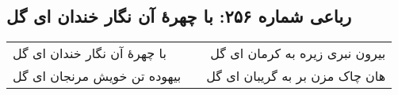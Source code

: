 \begin{center}
\section*{رباعی شماره ۲۵۶: با چهرهٔ آن نگار خندان ای گل}
\label{sec:sh256}
\begin{longtable}{l p{0.5cm} r}
با چهرهٔ آن نگار خندان ای گل
&&
بیرون نبری زیره به کرمان ای گل
\\
بیهوده تن خویش مرنجان ای گل
&&
هان چاک مزن بر به گریبان ای گل
\\
\end{longtable}
\end{center}

